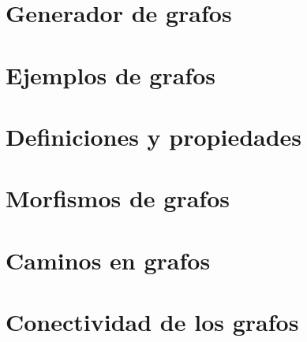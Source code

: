 
\section{Generador de grafos}


\section{Ejemplos de grafos}


\section{Definiciones y propiedades}


\section{Morfismos de grafos}


\section{Caminos en grafos}


\section{Conectividad de los grafos}


